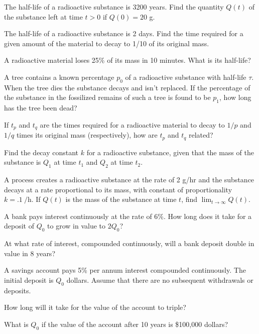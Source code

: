 \exercises

\begin{exerciselist}
\item\label{exer:4.1.1}The half-life of a radioactive substance is 3200
years.  Find the quantity $Q(t)$ of the substance left at
time $t > 0$ if $Q(0)=20$ g.

\item\label{exer:4.1.2}The half-life of a radioactive substance is 2 days.  Find
the time required for a given amount of the material to
decay to 1/10 of its original mass.

\item\label{exer:4.1.3}A  radioactive material loses 25\% of its mass
in 10 minutes.  What is its half-life?

\item\label{exer:4.1.4}A  tree contains a known percentage $p_0$ of
a radioactive substance with half-life $\tau$.  When the
tree dies the substance decays and isn't  replaced.  If the
percentage of the substance in the fossilized remains of
such a tree is found to be $p_1$, how long has the tree been
dead?

\item\label{exer:4.1.5}If $t_p$ and $t_q$ are the times required for a radioactive
material to decay to $1/p$ and $1/q$  times
its original mass (respectively), how are $t_p$ and $t_q$ related?

\item\label{exer:4.1.6}Find the decay constant $k$ for a radioactive substance,
given that the mass of the substance is $Q_1$ at time $t_1$
and $Q_2$ at time $t_2$.

\item\label{exer:4.1.7}A process creates a radioactive substance at the rate of 2
g/hr and the substance decays at a rate proportional to
its mass, with constant of proportionality
$k=\qty{.1}{\per\hour}$.  If $Q(t)$ is the mass of the
substance at time $t$, find $\lim_{t\to\infty}Q(t)$.

\item\label{exer:4.1.8}A bank pays interest continuously at the rate of 6\%.
How long does it take for a deposit of $Q_0$ to grow in
value to $2Q_0$?

\item\label{exer:4.1.9}At what rate of interest, compounded continuously, will a
bank deposit double in value in 8 years?

\item\label{exer:4.1.10}A savings account pays 5\% per annum interest compounded
continuously. The initial deposit is $Q_0$ dollars. Assume that there
are no subsequent withdrawals or deposits.
\begin{alist}
\item %
How long will it take for the value of the account to triple?
\item %
What is $Q_0$ if the value of the account after 10 years is \$100,000
dollars?
\end{alist}


\end{exerciselist}
